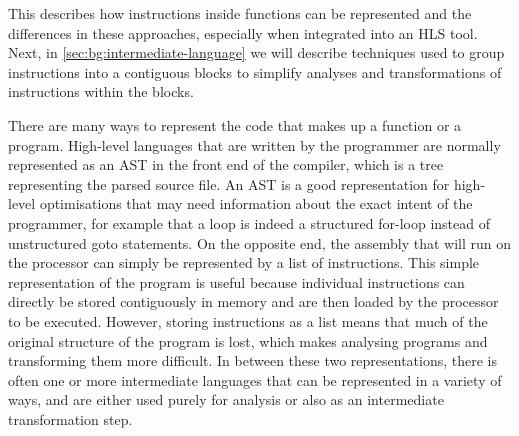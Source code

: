 This  describes how
instructions inside functions can be represented and the differences in these
approaches, especially when integrated into an \gls{HLS} tool.  Next, in
\cref{sec:bg:intermediate-language} we will describe techniques used to group
instructions into a contiguous blocks to simplify analyses and transformations
of instructions within the blocks.

There are many ways to represent the code that makes up a function or a program.
High-level languages that are written by the programmer are normally represented
as an \gls{AST} in the front end of the compiler, which is a tree representing
the parsed source file.  An \gls{AST} is a good representation for high-level
optimisations that may need information about the exact intent of the
programmer, for example that a loop is indeed a structured for-loop instead of
unstructured goto statements.  On the opposite end, the assembly that will run
on the processor can simply be represented by a list of instructions.  This
simple representation of the program is useful because individual instructions
can directly be stored contiguously in memory and are then loaded by the
processor to be executed.  However, storing instructions as a list means that
much of the original structure of the program is lost, which makes analysing
programs and transforming them more difficult.  In between these two
representations, there is often one or more intermediate languages that can be
represented in a variety of ways, and are either used purely for analysis or
also as an intermediate transformation step.



